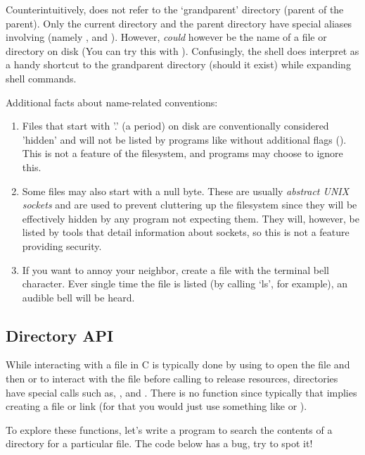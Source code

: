 Counterintuitively,  does not refer to the `grandparent' directory (parent of the parent).
Only the current directory and the parent directory have special aliases involving  (namely ,  and ).
However,  \emph{could} however be the name of a file or directory on disk (You can try this with ).
Confusingly, the shell  does interpret  as a handy shortcut to the grandparent directory (should it exist) while expanding shell commands.

Additional facts about name-related conventions:

\begin{enumerate}
    \item Files that start with '.' (a period) on disk are conventionally considered 'hidden' and will not be listed by programs like  without additional flags ().
        This is not a feature of the filesystem, and programs may choose to ignore this.
    \item Some files may also start with a null byte.
            These are usually \emph{abstract UNIX sockets} and are used to prevent cluttering up the filesystem since they will be effectively hidden by any program not expecting them.
            They will, however, be listed by tools that detail information about sockets, so this is not a feature providing security.
    \item If you want to annoy your neighbor, create a file with the terminal bell character.
        Ever single time the file is listed (by calling `ls', for example), an audible bell will be heard.
\end{enumerate}

\subsection{Directory API}

While interacting with a file in C is typically done by using  to open the file and then  or  to interact with the file before calling  to release resources, directories have special calls such as, ,  and .
There is no function  since typically that implies creating a file or link (for that you would just use something like  or ).

To explore these functions, let's write a program to search the contents of a directory for a particular file.
The code below has a bug, try to spot it!

